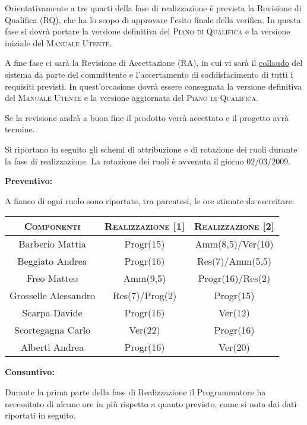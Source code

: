 \documentclass[11pt,a4paper]{article}
\begin{document}
Orientativamente a tre quarti della fase di realizzazione è prevista la Revisione di Qualifica (RQ), che ha lo scopo di approvare l'esito finale della verifica. In questa fase si dovrà portare la versione definitiva del \textsc{Piano di Qualifica} e la versione iniziale del \textsc{Manuale Utente}.

A fine fase ci sarà la Revisione di Accettazione (RA), in cui vi sarà il \underline{collaudo} del sistema da parte del committente e l'accertamento di soddisfacimento di tutti i requisiti previsti. In quest'occasione dovrà essere consegnata la versione definitiva del \textsc{Manuale Utente} e la versione aggiornata del \textsc{Piano di Qualifica}.

Se la revisione andrà a buon fine il prodotto verrà accettato e il progetto avrà termine.

Si riportano in seguito gli schemi di attribuzione e di rotazione dei ruoli durante la fase di realizzazione. La rotazione dei ruoli è avvenuta il giorno 02/03/2009.

\bigskip \bigskip 
\begin{large}\textbf{Preventivo:}\end{large}
\newline
A fianco di ogni ruolo sono riportate, tra parentesi, le ore stimate da esercitare:
\\
\begin{center}
\begin{tabular}{|c||c|c|}
\hline
\textsc{Componenti} & \textsc{Realizzazione [1]} & \textsc{Realizzazione [2]} \\ \hline \hline
Barberio Mattia & Progr(15) & Amm(8,5)/Ver(10) \\ \hline
Beggiato Andrea & Progr(16) & Res(7)/Amm(5,5) \\ \hline
Freo Matteo & Amm(9,5) & Progr(16)/Res(2) \\ \hline
Grosselle Alessandro & Res(7)/Prog(2) & Progr(15) \\ \hline
Scarpa Davide & Progr(16) & Ver(12) \\ \hline
Scortegagna Carlo & Ver(22) & Progr(16) \\ \hline
Alberti Andrea & Progr(16) & Ver(20) \\ \hline
\end{tabular}
\end{center}

\bigskip \bigskip 
\begin{large}\textbf{Consuntivo:}\end{large}
\newline
Durante la prima parte della fase di Realizzazione il Programmatore ha necessitato di alcune ore in più rispetto a quanto previsto, come si nota dai dati riportati in seguito.
\end{document}
